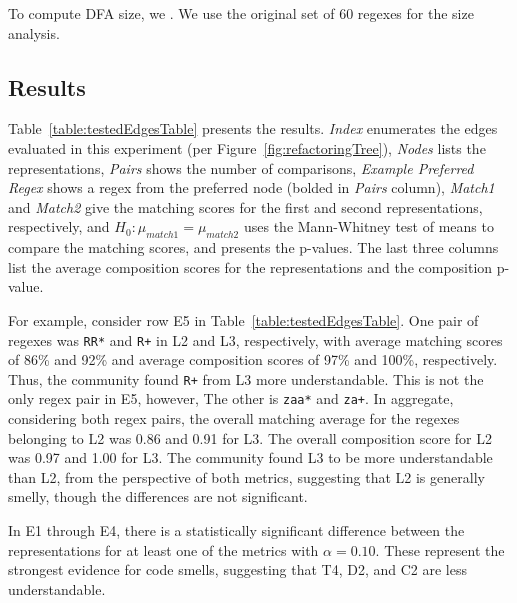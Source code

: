 To compute DFA size, we .
We use the original set of 60 regexes for the size analysis. 

\subsection{Results}
Table~\ref{table:testedEdgesTable} presents the results. 
\emph{Index}  enumerates the edges  evaluated in this experiment (per Figure~\ref{fig:refactoringTree}), \emph{Nodes} lists the representations, \emph{Pairs} shows the number of comparisons, \emph{Example Preferred Regex} shows a regex from the preferred node (bolded in \emph{Pairs} column), \emph{Match1} and \emph{Match2} give the matching scores for the first and second representations, respectively, and $H_0: \mu_{match1} = \mu_{match2}$ uses the Mann-Whitney test of means to compare the matching scores, and presents the p-values. The last three columns list the average composition scores for the representations and the composition p-value. 

For example, consider row E5 in Table~\ref{table:testedEdgesTable}. 
One pair of regexes was \verb!RR*! and \verb!R+! in L2 and L3, respectively, with average matching scores of 86\%  and 92\% and average composition scores of 97\%  and 100\%, respectively. 
Thus, the community found \verb!R+! from L3 more understandable. 
This is not the only regex pair in E5, however, The other is \verb!zaa*! and \verb!za+!. %
In aggregate, considering both regex pairs, the overall matching average for the regexes belonging to L2 was 0.86 and 0.91 for L3. 
The overall composition score for L2 was 0.97 and 1.00 for L3. 
The community found L3 to be more understandable than L2, from the perspective of both metrics, suggesting that L2 is generally smelly, though the differences are not significant. 



%
%
%
%
%



 In E1 through E4, there is a statistically significant difference between the representations for at least one of the metrics with $\alpha = 0.10$.  These represent the strongest evidence for code smells, suggesting that T4, D2, and C2 are less understandable. 


